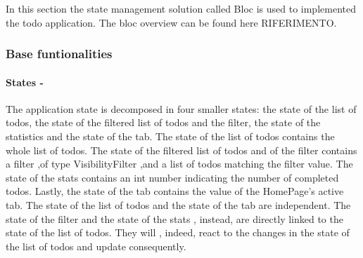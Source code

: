 In this section the state management solution called Bloc is used to implemented the todo application. The bloc overview can be found here RIFERIMENTO.
\subsubsection{Base funtionalities}  \label{par:todo_app_inherited_widget_introduction}
\paragraph{States - }
\label{subpar:todo_app_bloc_core_state}
The application state is decomposed in four smaller states: the state of the list of todos, the state of the filtered list of todos and the filter, the state of the statistics and the state of the tab. The state of the list of todos contains the whole list of todos. The state of the filtered list of todos and of the filter contains a filter ,of type VisibilityFilter ,and a list of todos matching the filter value. The state of the stats contains an int number indicating the number of completed todos. Lastly, the state of the tab contains the value of the HomePage’s active tab. The state of the list of todos and the state of the tab are independent. The state of the filter and the state of the stats , instead, are directly linked to the state of the list of todos. They will , indeed, react to the changes in the state of the list of todos and update consequently. 

